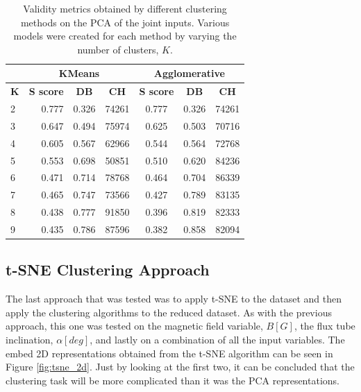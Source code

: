 \begin{table}[h]
    \caption[Validity metrics for PCA of the Joint Inputs]{Validity metrics obtained by different clustering methods on the PCA of the joint inputs. Various models were created for each method by varying the number of clusters, $K$.}\label{tab:pca_joint}
    \begin{tabular}{@{}lrcc|ccc@{}}
    \cmidrule(l){2-7}
    \textbf{}                       & \multicolumn{3}{c|}{\textbf{KMeans}}         & \multicolumn{3}{c}{\textbf{Agglomerative}}   \\ \midrule
    \multicolumn{1}{l|}{\textbf{K}} & \textbf{S score} & \textbf{DB} & \textbf{CH} & \textbf{S score} & \textbf{DB} & \textbf{CH} \\ \midrule
    \multicolumn{1}{l|}{2}          & 0.777            & 0.326       & 74261       & 0.777            & 0.326       & 74261       \\
    \multicolumn{1}{l|}{3}          & 0.647            & 0.494       & 75974       & 0.625            & 0.503       & 70716       \\
    \multicolumn{1}{l|}{4}          & 0.605            & 0.567       & 62966       & 0.544            & 0.564       & 72768       \\
    \multicolumn{1}{l|}{5}          & 0.553            & 0.698       & 50851       & 0.510            & 0.620       & 84236       \\
    \multicolumn{1}{l|}{6}          & 0.471            & 0.714       & 78768       & 0.464            & 0.704       & 86339       \\
    \multicolumn{1}{l|}{7}          & 0.465            & 0.747       & 73566       & 0.427            & 0.789       & 83135       \\
    \multicolumn{1}{l|}{8}          & 0.438            & 0.777       & 91850       & 0.396            & 0.819       & 82333       \\
    \multicolumn{1}{l|}{9}          & 0.435            & 0.786       & 87596       & 0.382            & 0.858       & 82094       \\ \bottomrule
    \end{tabular}
    \end{table}


\subsection{t-SNE Clustering Approach}\label{sec:tsne_clustering}
The last approach that was tested was to apply t-SNE to the dataset and then apply the clustering algorithms to the reduced dataset. As with the previous approach, this one was tested on the magnetic field variable, $B[G]$, the flux tube inclination, $\alpha [deg]$, and lastly on a combination of all the input variables. The embed 2D representations obtained from the t-SNE algorithm can be seen in Figure \ref{fig:tsne_2d}. Just by looking at the first two, it can be concluded that the clustering task will be more complicated than it was the PCA representations.

